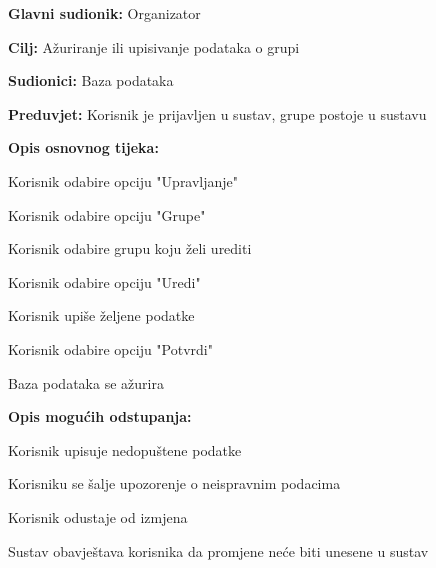 					\noindent {}
					\begin{packed_item}
						
						\item \textbf{Glavni sudionik: } Organizator
						\item  \textbf{Cilj:} Ažuriranje ili upisivanje podataka o grupi
						\item  \textbf{Sudionici:} Baza podataka
						\item  \textbf{Preduvjet:} Korisnik je prijavljen u sustav, grupe postoje u sustavu
						\item  \textbf{Opis osnovnog tijeka:}
						
						\item[] \begin{packed_enum}
							
							\item Korisnik odabire opciju "Upravljanje"
							\item Korisnik odabire opciju "Grupe"
							\item Korisnik odabire grupu koju želi urediti
							\item Korisnik odabire opciju "Uredi"
							\item Korisnik upiše željene podatke
							\item Korisnik odabire opciju "Potvrdi"
							\item Baza podataka se ažurira
						\end{packed_enum}
						
						\item  \textbf{Opis mogućih odstupanja:}
						
						\item[] \begin{packed_item}
							
							\item[5.a] Korisnik upisuje nedopuštene podatke
							\item[] \begin{packed_enum}
								
								\item Korisniku se šalje upozorenje o neispravnim podacima
								
							\end{packed_enum}
							\item[5.b] Korisnik odustaje od izmjena
							\item [] \begin{packed_enum}
								
								\item Sustav obavještava korisnika da promjene neće biti unesene u sustav
							\end{packed_enum}
						\end{packed_item}
					\end{packed_item}
				
